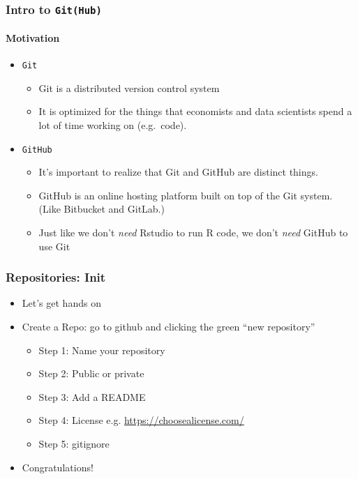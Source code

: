 \documentclass[
  shownotes,
  xcolor={svgnames},
  hyperref={colorlinks,citecolor=DarkBlue,linkcolor=DarkRed,urlcolor=DarkBlue}
  ]{beamer}
\begin{document}
\begin{frame}[fragile]
\frametitle{ Intro to \texttt{Git(Hub)}}
\framesubtitle{Motivation}


\begin{itemize}
\item \texttt{Git}


\begin{itemize}
\medskip
\item Git is a distributed version control system
\medskip
\item It is optimized for the things that economists and data scientists spend a lot of time working
  on (e.g.~code).

\end{itemize}


\bigskip
\item \texttt{GitHub}
\medskip
\begin{itemize}

\item It's important to realize that Git and GitHub are distinct things.
\medskip
\item GitHub is an online hosting platform  built on top of the Git system. (Like Bitbucket and GitLab.)
\medskip
\item Just like we don't \emph{need} Rstudio to run R code, we don't
  \emph{need} GitHub to use Git 
\end{itemize}
\end{itemize}
\end{frame}

\begin{frame}[fragile]
\frametitle{Repositories: Init}

\begin{itemize}
  \item Let's get hands on 
  \bigskip
  \item Create a Repo: go to github and clicking the green ``new repository''

  \begin{itemize}

    \item Step 1: Name your repository 
    \medskip
    \item Step 2: Public or private 
    \medskip
    \item Step 3: Add a README 
    \medskip
    \item Step 4: License e.g. \url{https://choosealicense.com/}
    \medskip
    \item Step 5: gitignore 
  \end{itemize}
    \bigskip
  \item Congratulations!
\end{itemize}
\end{frame}
\end{document}
